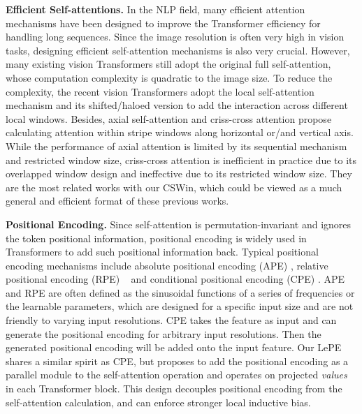 \documentclass[10pt,twocolumn,letterpaper]{article}
\begin{document}
\noindent \textbf{Efficient Self-attentions.} In the NLP field, many efficient attention mechanisms \cite{child2019generating,rae2019compressive,choromanski2020rethinking,katharopoulos2020Transformers,kitaev2020reformer,tay2020sparse,roy2021efficient, beltagy2020longformer} have been designed to improve the Transformer efficiency for handling long sequences. Since the image resolution is often very high in vision tasks, designing efficient self-attention mechanisms is also very crucial. However, many existing vision Transformers \cite{dosovitskiy2020vit,touvron2020deit,yuan2021tokens,wu2021cvt} still adopt the original full self-attention, whose computation complexity is quadratic to the image size. To reduce the complexity, the recent vision Transformers \cite{liu2021swin, vaswani2021scaling} adopt the local self-attention mechanism \cite{ramachandran2019stand} and its shifted/haloed version to add the interaction across different local windows.
Besides, axial self-attention\cite{ho2019axial} and criss-cross attention\cite{huang2020ccnet} propose calculating attention within stripe windows along horizontal or/and vertical axis. While the performance of axial attention is limited by its sequential mechanism and restricted window size, criss-cross attention is inefficient in practice due to its overlapped window design and ineffective due to its restricted window size. They are the most related works with our CSWin, which could be viewed as a much general and efficient format of these previous works.

 
\noindent \textbf{Positional Encoding.} Since self-attention is permutation-invariant and ignores the token positional information, positional encoding is widely used in Transformers to add such positional information back. Typical positional encoding mechanisms include absolute positional encoding (APE) \cite{vaswani2017attention}, relative positional encoding (RPE) ~\cite{shaw2018self,liu2021swin} and conditional positional encoding (CPE) \cite{chu2021conditional}. 
APE and RPE are often defined as the sinusoidal functions of a series of frequencies or the learnable parameters, which are designed for a specific input size and are not friendly to varying input resolutions.
CPE takes the feature as input and can generate the positional encoding for arbitrary input resolutions. Then the generated positional encoding will be added onto the input feature. Our LePE shares a similar spirit as CPE, but proposes to add the positional encoding as a parallel module to the self-attention operation and operates on projected \emph{values} in each Transformer block. This design decouples positional encoding from the self-attention calculation, and can enforce stronger local inductive bias. 
\end{document}

